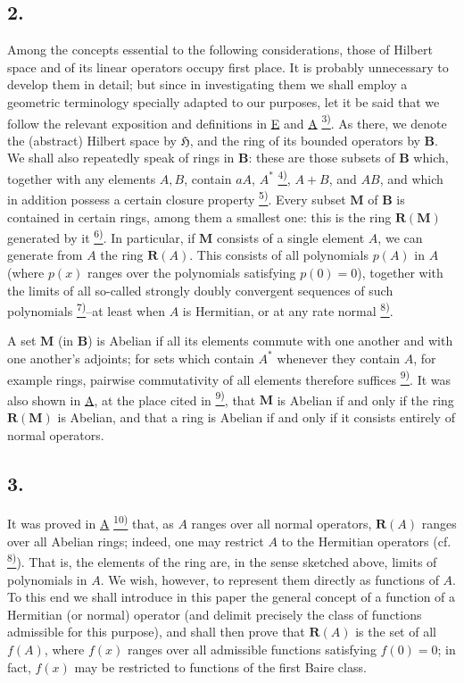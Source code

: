 \documentclass[12pt,b5paper,twoside]{article}
\newcommand{\noteref}[1]{%
  \hyperlink{note:#1}{\textsuperscript{#1)}}}
\begin{document}
\subsection*{2.}
\label{sec:intro.2}
Among the concepts essential to the following considerations, those of Hilbert space and of its linear operators occupy first place. It is probably unnecessary to develop them in detail; but since in investigating them we shall employ a geometric terminology specially adapted to our purposes, let it be said that we follow the relevant exposition and definitions in \hyperref[ref:E]{E} and \hyperref[ref:A]{A}\noteref{3}. As there, we denote the (abstract) Hilbert space by $\mathfrak H$, and the ring of its bounded operators by $\mathbf B$. We shall also repeatedly speak of rings in $\mathbf B$: these are those subsets of $\mathbf B$ which, together with any elements $A,B$, contain $aA$, $A^*$\noteref{4}, $A+B$, and $AB$, and which in addition possess a certain closure property\noteref{5}. Every subset $\mathbf M$ of $\mathbf B$ is contained in certain rings, among them a smallest one: this is the ring $\mathbf R(\mathbf M)$ generated by it\noteref{6}. In particular, if $\mathbf M$ consists of a single element $A$, we can generate from $A$ the ring $\mathbf R(A)$. This consists
of all polynomials $p(A)$ in $A$ (where $p(x)$ ranges over the polynomials satisfying $p(0)=0$), together with the limits of all so-called strongly doubly convergent sequences of such polynomials\noteref{7}--at least when $A$ is Hermitian, or at any rate normal\noteref{8}.

A set $\mathbf M$ (in $\mathbf B$) is Abelian if all its elements commute with one another and with one another's adjoints; for sets which contain $A^*$ whenever they contain $A$, for example rings, pairwise commutativity of all elements therefore suffices\noteref{9}. It was also shown in \hyperref[ref:A]{A}, at the place cited in \noteref{9}, that $\mathbf M$ is Abelian if and only if the ring $\mathbf R(\mathbf M)$ is Abelian, and that a ring is Abelian if and only if it consists entirely of normal operators.

\subsection*{3.}
\label{sec:intro.3}
It was proved in \hyperref[ref:A]{A}\noteref{10} that, as $A$ ranges over all normal operators, $\mathbf R(A)$ ranges over all Abelian rings; indeed, one may restrict $A$ to the Hermitian operators (cf. \noteref{8}). That is, the elements of the ring are, in the sense sketched above, limits of polynomials in $A$. We wish, however, to represent them directly as functions of $A$. To this end we shall introduce in this paper the general concept of a function of a Hermitian (or normal) operator (and delimit precisely the class of functions admissible for this purpose), and shall then prove that $\mathbf R(A)$ is the set of all $f(A)$, where $f(x)$ ranges over all admissible functions satisfying $f(0)=0$; in fact, $f(x)$ may be restricted to functions of the first Baire class.
\end{document}
